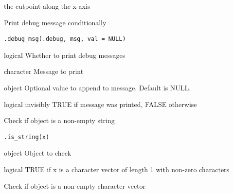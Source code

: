 \documentclass[letterpaper]{book}
\begin{document}
%
\begin{Value}
the cutpoint along the x-axis
\end{Value}
%
\begin{Description}
Print debug message conditionally
\end{Description}
%
\begin{Usage}
\begin{verbatim}
.debug_msg(.debug, msg, val = NULL)
\end{verbatim}
\end{Usage}
%
\begin{Arguments}
\begin{ldescription}
\item[\code{.debug}] logical Whether to print debug messages

\item[\code{msg}] character Message to print

\item[\code{val}] object Optional value to append to message. Default is NULL.
\end{ldescription}
\end{Arguments}
%
\begin{Value}
logical invisibly TRUE if message was printed, FALSE otherwise
\end{Value}
%
\begin{Description}
Check if object is a non-empty string
\end{Description}
%
\begin{Usage}
\begin{verbatim}
.is_string(x)
\end{verbatim}
\end{Usage}
%
\begin{Arguments}
\begin{ldescription}
\item[\code{x}] object Object to check
\end{ldescription}
\end{Arguments}
%
\begin{Value}
logical TRUE if x is a character vector of length 1 with non-zero characters
\end{Value}
%
\begin{Description}
Check if object is a non-empty character vector
\end{Description}
\end{document}
